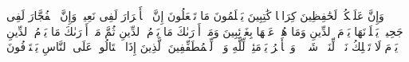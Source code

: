 \startbuffer[\q:82:10]
وَإِنَّ عَلَیۡكُمۡ لَحَٰفِظِینَ%
\stopbuffer
\startbuffer[\q:82:11]
كِرَامࣰا كَٰتِبِینَ%
\stopbuffer
\startbuffer[\q:82:12]
یَعۡلَمُونَ مَا تَفۡعَلُونَ%
\stopbuffer
\startbuffer[\q:82:13]
إِنَّ ٱلۡأَبۡرَارَ لَفِی نَعِیمࣲ%
\stopbuffer
\startbuffer[\q:82:14]
وَإِنَّ ٱلۡفُجَّارَ لَفِی جَحِیمࣲ%
\stopbuffer
\startbuffer[\q:82:15]
یَصۡلَوۡنَهَا یَوۡمَ ٱلدِّینِ%
\stopbuffer
\startbuffer[\q:82:16]
وَمَا هُمۡ عَنۡهَا بِغَاۤئِبِینَ%
\stopbuffer
\startbuffer[\q:82:17]
وَمَاۤ أَدۡرَىٰكَ مَا یَوۡمُ ٱلدِّینِ%
\stopbuffer
\startbuffer[\q:82:18]
ثُمَّ مَاۤ أَدۡرَىٰكَ مَا یَوۡمُ ٱلدِّینِ%
\stopbuffer
\startbuffer[\q:82:19]
یَوۡمَ لَا تَمۡلِكُ نَفۡسࣱ لِّنَفۡسࣲ شَیۡءࣰاۖ وَٱلۡأَمۡرُ یَوۡمَئِذࣲ لِّلَّهِ%
\stopbuffer
\startbuffer[\q:83:1]
وَیۡلࣱ لِّلۡمُطَفِّفِینَ%
\stopbuffer
\startbuffer[\q:83:2]
ٱلَّذِینَ إِذَا ٱكۡتَالُوا۟ عَلَى ٱلنَّاسِ یَسۡتَوۡفُونَ%
\stopbuffer
